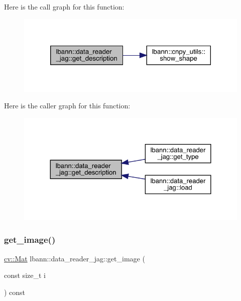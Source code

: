 Here is the call graph for this function\+:\nopagebreak
\begin{figure}[H]
\begin{center}
\leavevmode
\includegraphics[width=320pt]{classlbann_1_1data__reader__jag_a627474a612a158675918ec5b5518c80f_cgraph}
\end{center}
\end{figure}
Here is the caller graph for this function\+:\nopagebreak
\begin{figure}[H]
\begin{center}
\leavevmode
\includegraphics[width=324pt]{classlbann_1_1data__reader__jag_a627474a612a158675918ec5b5518c80f_icgraph}
\end{center}
\end{figure}
\mbox{\label{classlbann_1_1data__reader__jag_aee6e15cf6eda3bc97d1f7b077d74747a}} 
\subsubsection{\texorpdfstring{get\+\_\+image()}{get\_image()}}
{\footnotesize\ttfamily \hyperlink{base_8hpp_a68f11fdc31b62516cb310831bbe54d73}{cv\+::\+Mat} lbann\+::data\+\_\+reader\+\_\+jag\+::get\+\_\+image (\begin{DoxyParamCaption}\item[{const size\+\_\+t}]{i }\end{DoxyParamCaption}) const}



